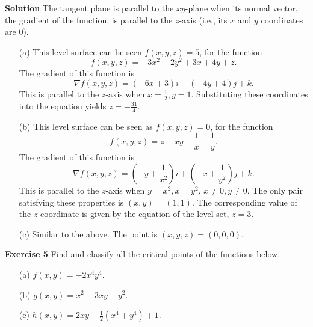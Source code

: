 \documentclass[12pt,oneside]{exam}
\newenvironment{exercise}[1]{\vspace{.1in}\noindent\textbf{Exercise #1 \hspace{.05em}}}{}
\newenvironment{newsolution}{\vspace{.1in}\noindent\textbf{Solution \hspace{.05em}}}{}
\begin{document}
\begin{newsolution}
The tangent plane is parallel to the $xy$-plane when its normal vector, the gradient of the function, is parallel to the $z$-axis (i.e., its $x$ and $y$ coordinates are $0$). 
\begin{itemize}
\item[(a)] This level surface can be seen $f(x,y,z)=5$, for the function 
\begin{equation*}
f(x,y,z)= -3x^2-2y^2+3x+4y+z.
\end{equation*}
The gradient of this function is 
\begin{equation*}
\nabla f (x,y,z)= (-6x+3)i +(-4y+4)j +k.
\end{equation*}
This is parallel to the $z$-axis when $x=\frac{1}{2}, y=1$. Substituting these coordinates into the equation yields $z=-\frac{31}{4}$.
\item[(b)] This level surface can be seen as $f(x,y,z)=0$, for the function 
\begin{equation*}
f(x,y,z)=z-xy-\frac{1}{x}-\frac{1}{y}.
\end{equation*}
The gradient of this function is 
\begin{equation*}
\nabla f(x,y,z)= \left(-y+\frac{1}{x^2}\right) i + \left(-x+\frac{1}{y^2}\right)j +k.
\end{equation*}
This is parallel to the $z$-axis when $y=x^2, x=y^2$, $x \neq 0, y \neq 0$. The only pair satisfying these properties is $(x,y)=(1,1)$. The corresponding value of the $z$ coordinate is given by the equation of the level set, $z=3$. 
\item[(c)] Similar to the above. The point is $(x,y,z)=(0,0,0)$. 
\end{itemize}
\end{newsolution}

\begin{exercise}{5}
Find and classify all the critical points of the functions below. 
\begin{itemize}
\item[(a)] $f(x,y)=-2x^4y^4$. 
\item[(b)] $g(x,y)=x^2-3xy-y^2$. 
\item[(c)] $h(x,y)=2xy-\frac{1}{2}(x^4+y^4) +1$.  
\end{itemize}
\end{exercise}
\end{document}
